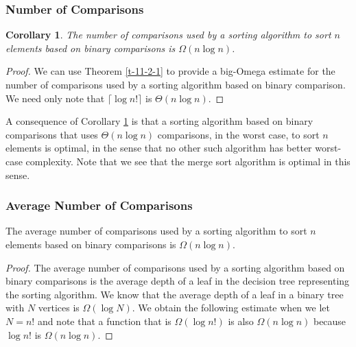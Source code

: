 \documentclass[10pt, compress]{beamer}
\newtheorem{crl}{Corollary}[theorem]
\begin{document}
\begin{frame}[fragile]
\frametitle{Number of Comparisons}
\begin{crl}\label{c-11-2-1}
	The number of comparisons used by a sorting algorithm to sort $n$ elements based on binary comparisons is $\Omega(n \log n)$.
\end{crl}
\begin{proof}
	We can use Theorem \ref{t-11-2-1} to provide a big-Omega estimate for the number of comparisons used by a sorting algorithm based on binary comparison. We need only note that $\lceil \log n! \rceil$ is $\Theta(n \log n)$.
\end{proof}

A consequence of Corollary \ref{c-11-2-1} is that a sorting algorithm based on binary comparisons that
uses $\Theta(n \log n)$ comparisons, in the worst case, to sort $n$ elements is optimal, in the sense that no other such algorithm has better worst-case complexity. Note that we see that the merge sort algorithm is optimal in this sense.

\end{frame}

\begin{frame}[fragile]
\frametitle{Average Number of Comparisons}
\begin{theorem}
	The average number of comparisons used by a sorting algorithm to sort $n$ elements based on binary comparisons is $\Omega(n \log n)$.
\end{theorem}
\begin{proof}
	The average number of comparisons used by a sorting algorithm based on binary comparisons is the average depth of a leaf in the decision tree representing the sorting algorithm. We know that the average depth of a leaf in a binary tree with $N$ vertices
	is $\Omega(\log N)$. We obtain the following estimate when we let $N = n!$ and note that a function that is $\Omega(\log n!)$ is also $\Omega(n \log n)$ because $\log n!$ is $\Omega (n \log n)$.
\end{proof}
\end{frame}

\end{document}
